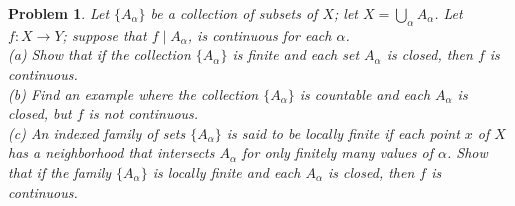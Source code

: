\documentclass{article}
\newtheorem{problem}{Problem}
\begin{document}
\begin{problem}
Let $\{A_{\alpha}\}$ be a collection of subsets of $X$; let $X = \bigcup_{\alpha} A_{\alpha}$. Let $f : X \to Y$; suppose that $f \mid A_{\alpha}$, is continuous for each $\alpha$.\\
(a) Show that if the collection $\{A_{\alpha}\}$ is finite and each set $A_{\alpha}$ is closed, then $f$ is continuous.\\
(b) Find an example where the collection $\{A_{\alpha}\}$ is countable and each $A_{\alpha}$ is closed, but $f$ is not continuous.\\
(c) An indexed family of sets $\{A_{\alpha}\}$ is said to be \emph{locally finite} if each point $x$ of $X$ has a neighborhood that intersects $A_{\alpha}$ for only finitely many values of $\alpha$. Show that if the family $\{A_{\alpha}\}$ is locally finite and each $A_{\alpha}$ is closed, then $f$ is continuous.
\end{problem}
\end{document}
